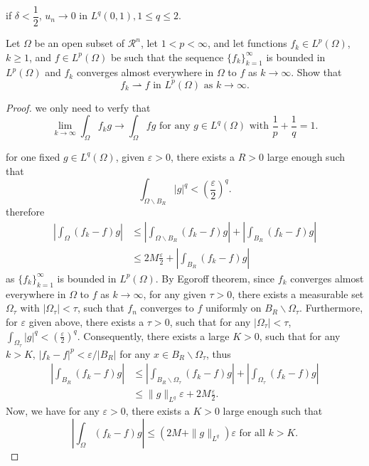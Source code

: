 if $\delta < \dfrac{1}{2}$, $u_n\rightarrow0$ in $L^q(0,1), 1\leqslant q \leqslant 2$.

\begin{lemma}
Let $\Omega$ be an open subset of $\mathcal{R}^n$, let $1<p<\infty$, and let functions $f_k\in L^p(\Omega)$, $k\geqslant1$, and $f\in L^p(\Omega)$ be such that the sequence $\{f_k\}_{k=1}^{\infty}$ is bounded in $L^p(\Omega)$ and $f_k$ converges almost everywhere in $\Omega$ to $f$ as $k\rightarrow \infty$. Show that 
\begin{equation}
	f_k\rightharpoonup f \text{ in } L^p(\Omega) \text{ as } k\rightarrow \infty.
\end{equation}	
\end{lemma}

\begin{proof}
	we only need to verfy that
	\begin{equation}
		\lim_{k\rightarrow\infty}\int_\Omega f_kg\rightarrow\int_\Omega fg \text{ for any } g\in L^q(\Omega) \text{ with } \frac1p+\frac1q=1.
	\end{equation}

	for one fixed $g\in L^q(\Omega)$, given $\varepsilon>0$, there exists a $R>0$ large enough such that 
	\begin{equation}
		\int_{\Omega\backslash B_R}|g|^q < (\frac\varepsilon2)^q.
	\end{equation}
therefore 
\begin{equation}
	\begin{split}
	|\int_\Omega(f_k-f)g|&\leqslant|\int_{\Omega\backslash B_R}(f_k-f)g| + |\int_{B_R}(f_k-f)g|\\
	&\leqslant 2M\frac\varepsilon2 + |\int_{B_R}(f_k-f)g|
\end{split}
\end{equation}
as $\{f_k\}_{k=1}^{\infty}$ is bounded in $L^p(\Omega)$. 
By Egoroff theorem, since $f_k$ converges almost everywhere in $\Omega$ to $f$ as $k\rightarrow \infty$, 
for any given $\tau>0$, there exists a measurable set $\Omega_\tau$ with $|\Omega_\tau|<\tau$, 
such that $f_n$ converges to $f$ uniformly on $B_R\backslash \Omega_\tau$. 
Furthermore, for $\varepsilon$ given above, there exists a $\tau>0$, 
such that for any $|\Omega_\tau|<\tau$, $\int_{\Omega_\tau}|g|^q<(\frac{\varepsilon}{2})^q.$ 
Consequently, there exists a large $K>0$, 
such that for any $k>K$, $|f_k-f|^p<\varepsilon/|B_R|$ for any $x\in B_R\backslash \Omega_\tau$, thus
\begin{equation}
	\begin{split}
		|\int_{B_R}(f_k-f)g|&\leqslant |\int_{B_R\backslash \Omega_\tau}(f_k-f)g| 
		+ |\int_{\Omega_\tau}(f_k-f)g|\\
		&\leqslant \|g\|_{L^q}\varepsilon +2M\frac{\varepsilon}{2}.
	\end{split}
\end{equation}
Now, we have for any $\varepsilon>0$, there exists a $K>0$ large enough such that 
\begin{equation}
	|\int_\Omega(f_k-f)g|\leqslant (2M+ \|g\|_{L^q})\varepsilon \text{ for all } k> K.
\end{equation}
\end{proof}


